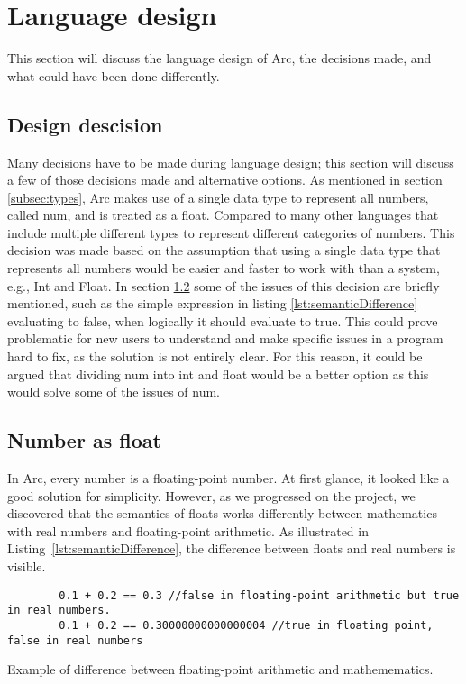 \section{Language design}

This section will discuss the language design of Arc, the decisions made, and what could have been done differently.

\subsection{Design descision} 
Many decisions have to be made during language design; this section will discuss a few of those decisions made and alternative options.
As mentioned in section \ref{subsec:types}, Arc makes use of a single data type to represent all numbers, called num, and is treated as a float. Compared to many other languages that include multiple different types to represent different categories of numbers. This decision was made based on the assumption that using a single data type that represents all numbers would be easier and faster to work with than a system, e.g., Int and Float. In section \ref{subsec:numberAsFloats} some of the issues of this decision are briefly mentioned, such as the simple expression in listing \ref{lst:semanticDifference} evaluating to false, when logically it should evaluate to true. This could prove problematic for new users to understand and make specific issues in a program hard to fix, as the solution is not entirely clear. For this reason, it could be argued that dividing num into int and float would be a better option as this would solve some of the issues of num.



\subsection{Number as float}\label{subsec:numberAsFloats}
In Arc, every number is a floating-point number. At first glance, it looked like a good solution for simplicity. However, as we progressed on the project, we discovered that the semantics of floats works differently between mathematics with real numbers and floating-point arithmetic. As illustrated in Listing~\ref{lst:semanticDifference}, the difference between floats and real numbers is visible.


\begin{listing}[htb!]
    \begin{verbatim}
        0.1 + 0.2 == 0.3 //false in floating-point arithmetic but true in real numbers.
        0.1 + 0.2 == 0.30000000000000004 //true in floating point, false in real numbers
    \end{verbatim}
    \caption{Example of difference between floating-point arithmetic and mathemematics.}
    \label{lst:semanticDifference}
\end{listing}


